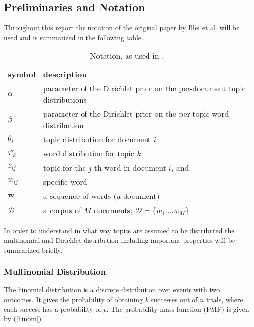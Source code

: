 \documentclass[a4paper,ngerman, english]{atseminar}
\begin{document}
\subsection{Preliminaries and Notation} \label{sec:pre}

Throughout this report the notation of the original paper by Blei et al. will be used and 
is summarized in the following table.

\begin{table}[h]
\centering
\caption{Notation, as used in \cite{blei2003latent}.}
\begin{tabular}{l l}
\textbf{symbol} & \textbf{description} \\
 $\alpha$       & parameter of the Dirichlet prior on the per-document topic distributions \\
 $\beta$        & parameter of the Dirichlet prior on the per-topic word distribution \\ 
 $\theta_i$     & topic distribution for document $i$ \\
 $\varphi_k$   & word distribution for topic $k$ \\
 $z_{ij}$         & topic for the $j$-th word in document $i$, and \\
 $w_{ij}$        & specific word \\
 $\textbf{w}$  &  a sequence of words (a document) \\
$\mathcal{D}$  &  a corpus of $M$ documents; $\mathcal{D} = \{$\textbf{$w_1$}....\textbf{$w_M$}$\}$

 
\end{tabular}
\label{XY:tab:interesting}
\end{table}


In order to understand in what way topics are assumed to be distributed the multinomial
and Dirichlet distribution including important properties will be summarized briefly.

\subsubsection{Multinomial Distribution}

The binomial distribution is a discrete distribution over events with two outcomes. It gives
the probability of obtaining $k$ successes out of $n$ trials, where each success has a probability 
of $p$.
The probability mass function (PMF) is given by (\autoref{binom}).
\end{document}
